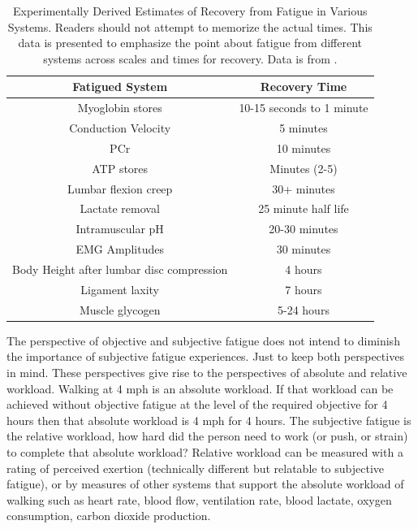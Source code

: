 \begin{table}[h!]
\centering
\begin{tabular}{||c c ||} 
 \hline
 Fatigued System & Recovery Time\\ [0.5ex] 
 \hline\hline
 Myoglobin stores & 10-15 seconds to 1 minute \\
 Conduction Velocity  & 5 minutes\\ 
 PCr & 10 minutes  \\
 ATP stores &  Minutes (2-5) \\ 
 Lumbar flexion creep & 30+ minutes \\
 Lactate removal & 25 minute half life \\
 Intramuscular pH & 20-30 minutes \\
 EMG Amplitudes & 30 minutes \\
 Body Height after lumbar disc compression & 4 hours \\
 Ligament laxity & 7 hours \\
 Muscle glycogen & 5-24 hours \\[1ex] 
 \hline
\end{tabular}
\caption{Experimentally Derived Estimates of Recovery from Fatigue in Various Systems. Readers should not attempt to memorize the actual times. This data is presented to emphasize the point about fatigue from different systems across scales and times for recovery. Data is from \cite{krajcarski_time_2008}.}
\label{table:fatigue_recovery}
\end{table}

\vspace{0.2cm}
The perspective of objective and subjective fatigue does not intend to diminish the importance of subjective fatigue experiences. Just to keep both perspectives in mind. These perspectives give rise to the perspectives of absolute and relative workload. Walking at 4 mph is an absolute workload. If that workload can be achieved without objective fatigue at the level of the required objective for 4 hours then that absolute workload is 4 mph for 4 hours. The subjective fatigue is the relative workload, how hard did the person need to work (or push, or strain) to complete that absolute workload? Relative workload can be measured with a rating of perceived exertion (technically different but relatable to subjective fatigue), or by measures of other systems that support the absolute workload of walking such as heart rate, blood flow, ventilation rate, blood lactate, oxygen consumption, carbon dioxide production. 

